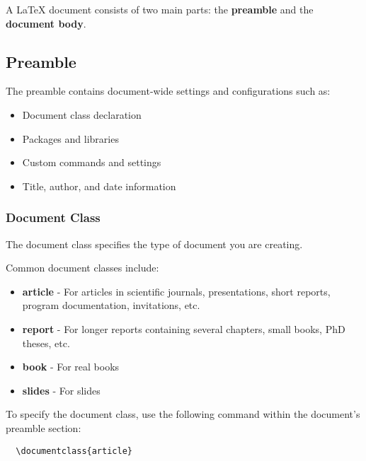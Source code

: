 \documentclass[12pt]{article}
\begin{document}
  A LaTeX document consists of two main parts: the \textbf{preamble} and the \textbf{document body}. 


  \subsection{Preamble}
  \label{sec:preamble}

  The preamble contains document-wide settings and configurations such as:

  \begin{itemize}
    \item Document class declaration
    \item Packages and libraries
    \item Custom commands and settings
    \item Title, author, and date information
  \end{itemize}


  \subsubsection{Document Class}
  \label{sec:document-class}

  The document class specifies the type of document you are creating. 
  
  Common document classes include:  

  \begin{itemize}
    \item \textbf{article} - For articles in scientific journals, presentations, short reports, program documentation, invitations, etc.
    \item \textbf{report} - For longer reports containing several chapters, small books, PhD theses, etc.
    \item \textbf{book} - For real books
    \item \textbf{slides} - For slides
  \end{itemize}

  To specify the document class, use the following command within the document's preamble section:

  \begin{verbatim}
  \documentclass{article}
  \end{verbatim}
\end{document}
